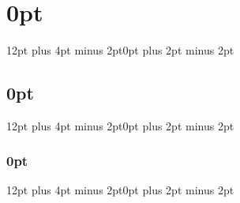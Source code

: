     \graphicspath{ {img/} }

    
    \newpage~




    \renewcommand{\arraystretch}{1.5}

    \setlength{\parskip}{1em}
    \setlength{\parindent}{0pt}

    \titlespacing\section{0pt}{12pt plus 4pt minus 2pt}{0pt plus 2pt minus 2pt}
    \titlespacing\subsection{0pt}{12pt plus 4pt minus 2pt}{0pt plus 2pt minus 2pt}
    \titlespacing\subsubsection{0pt}{12pt plus 4pt minus 2pt}{0pt plus 2pt minus 2pt}


    ~
    \thispagestyle{empty}
    \setcounter{page}{0}
    \newpage

	 \newpage

     \newpage

     \newpage

     \newpage
